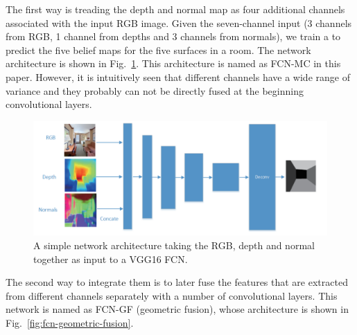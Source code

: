 The first way is treading the depth and normal map as four additional channels associated with the input RGB image. Given the seven-channel input (3 channels from RGB, 1 channel from depths and 3 channels from normals), we train a  to predict the five belief maps for the five surfaces in a room. The network architecture is shown in Fig.~\ref{fig:fcn-multi-channel}. This architecture is named as FCN-MC in this paper. 
%
However, it is intuitively seen that different channels have a wide range of variance and they probably can not be directly fused at the beginning convolutional layers. 

\begin{figure}
	\centering
	\includegraphics[width=\columnwidth]{figure/fcn-multi-channel.png}
	\caption{A simple network architecture taking the RGB, depth and normal together as input to a VGG16 FCN. }
	\label{fig:fcn-multi-channel}
\end{figure}

The second way to integrate them is to later fuse the features that are extracted from different channels separately with a number of convolutional layers. 
This network is named as FCN-GF (geometric fusion), whose architecture is shown in Fig.~\ref{fig:fcn-geometric-fusion}.
  
